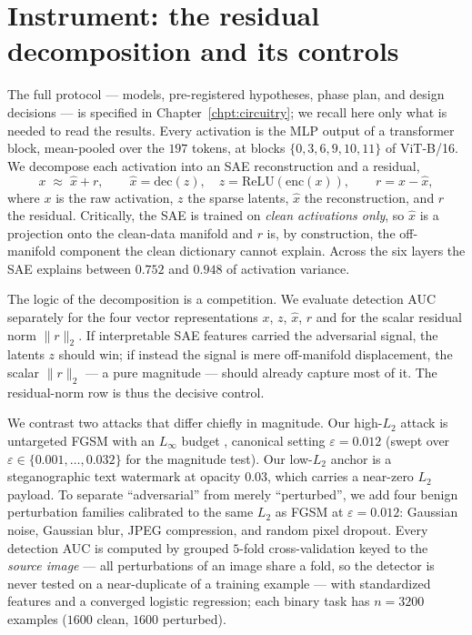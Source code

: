 \documentclass[../ppgc-tese.tex]{subfiles}
\begin{document}
\section{Instrument: the residual decomposition and its controls}
\label{sec:adv-setup}
The full protocol --- models, pre-registered hypotheses, phase plan, and design
decisions --- is specified in Chapter~\ref{chpt:circuitry}; we recall here only what
is needed to read the results. Every activation is the MLP output of a transformer
block, mean-pooled over the $197$ tokens, at blocks $\{0,3,6,9,10,11\}$ of ViT-B/16.
We decompose each activation into an SAE reconstruction and a residual,
\begin{equation}
  x \;\approx\; \hat{x} + r,
  \qquad \hat{x} = \mathrm{dec}(z), \quad z = \mathrm{ReLU}(\mathrm{enc}(x)),
  \qquad r = x - \hat{x},
  \label{eq:adv-decomp}
\end{equation}
where $x$ is the raw activation, $z$ the sparse latents, $\hat{x}$ the
reconstruction, and $r$ the residual. Critically, the SAE is trained on \emph{clean
activations only}, so $\hat{x}$ is a projection onto the clean-data manifold and $r$
is, by construction, the off-manifold component the clean dictionary cannot explain.
Across the six layers the SAE explains between $0.752$ and $0.948$ of activation
variance.

The logic of the decomposition is a competition. We evaluate detection AUC
separately for the four vector representations $x$, $z$, $\hat{x}$, $r$ and for the
scalar residual norm $\lVert r\rVert_2$. If interpretable SAE features carried the
adversarial signal, the latents $z$ should win; if instead the signal is mere
off-manifold displacement, the scalar $\lVert r\rVert_2$ --- a pure magnitude ---
should already capture most of it. The residual-norm row is thus the decisive
control.

We contrast two attacks that differ chiefly in magnitude. Our high-$L_2$ attack is
untargeted FGSM with an $L_\infty$ budget \cite{goodfellow2015fgsm}, canonical
setting $\varepsilon{=}0.012$ (swept over
$\varepsilon\in\{0.001,\dots,0.032\}$ for the magnitude test). Our low-$L_2$ anchor
is a steganographic text watermark at opacity $0.03$, which carries a near-zero
$L_2$ payload. To separate ``adversarial'' from merely ``perturbed'', we add four
benign perturbation families calibrated to the same $L_2$ as FGSM at
$\varepsilon{=}0.012$: Gaussian noise, Gaussian blur, JPEG compression, and random
pixel dropout. Every detection AUC is computed by grouped $5$-fold
cross-validation keyed to the \emph{source image} --- all perturbations of an image
share a fold, so the detector is never tested on a near-duplicate of a training
example --- with standardized features and a converged logistic regression; each
binary task has $n{=}3200$ examples ($1600$ clean, $1600$ perturbed).
\end{document}
